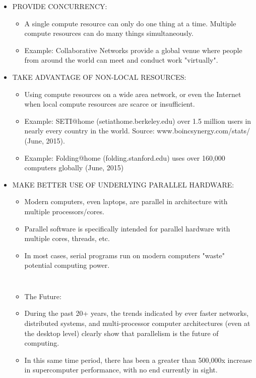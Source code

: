 \documentclass[10pt,t]{beamer}
\begin{document}
\begin{frame}[allowframebreaks,c]
\begin{itemize}
\begin{itemize}
    \end{itemize}
  \item PROVIDE CONCURRENCY:
    \begin{itemize}
    \item A single compute resource can only do one thing at a time. Multiple compute resources can do many things simultaneously.
    \item Example: Collaborative Networks provide a global venue where people from around the world can meet and conduct work "virtually".
    \end{itemize}
    \framebreak
  \item TAKE ADVANTAGE OF NON-LOCAL RESOURCES:
    \begin{itemize}
    \item Using compute resources on a wide area network, or even the Internet when local compute resources are scarce or insufficient.
    \item Example: SETI@home (setiathome.berkeley.edu) over 1.5 million users in nearly every country in the world. Source: www.boincsynergy.com/stats/ (June, 2015).
    \item Example: Folding@home (folding.stanford.edu) uses over 160,000 computers globally (June, 2015)
    \end{itemize}
  \item MAKE BETTER USE OF UNDERLYING PARALLEL HARDWARE:
    \begin{itemize}
    \item Modern computers, even laptops, are parallel in architecture with multiple processors/cores.
    \item Parallel software is specifically intended for parallel hardware with multiple cores, threads, etc.
    \item In most cases, serial programs run on modern computers "waste" potential computing power.
    \end{itemize}
    \framebreak
    \begin{columns}[c]
      \vspace{-0.25cm}
      \begin{itemize}
      \item The Future:
      \item During the past 20+ years, the trends indicated by ever faster networks, distributed systems, and multi-processor computer architectures (even at the desktop level) clearly show that parallelism is the future of computing.
      \item In this same time period, there has been a greater than 500,000x increase in supercomputer performance, with no end currently in sight.

\end{itemize}
\end{columns}
\end{itemize}
\end{frame}
\end{document}
